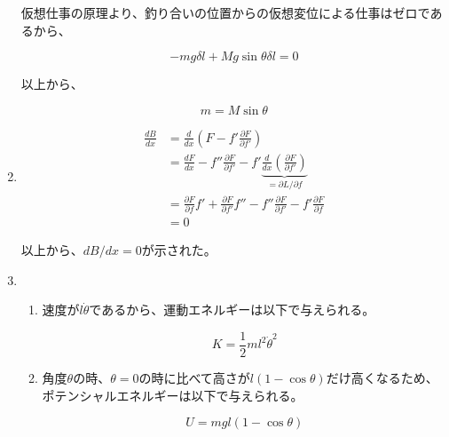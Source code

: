 \documentclass{jsarticle}
\begin{document}
\begin{enumerate}
        仮想仕事の原理より、釣り合いの位置からの仮想変位による仕事はゼロであるから、

        $$
          -mg \delta l + Mg \sin \theta \delta l = 0
        $$

        以上から、

        $$
          m = M\sin \theta
        $$
  \item
        $$
          \begin{aligned}
            \frac{dB}{dx} & = \frac{d}{dx} \left( F - f' \frac{\partial F}{\partial f'}\right)                  \\
                          & = \frac{dF}{dx} - f'' \frac{\partial F}{\partial f'}
            -  f' \underbrace{\frac{d}{dx}\left(\frac{\partial F}{\partial f'}\right)}_{=\partial L/\partial f} \\
                          & = \frac{\partial F}{\partial f}f' + \frac{\partial F}{\partial f'}f''
            - f'' \frac{\partial F}{\partial f'} - f' \frac{\partial F}{\partial f}                             \\
                          & = 0
          \end{aligned}
        $$

        以上から、$dB/dx = 0$が示された。
  \item
        \begin{enumerate}
          \item 速度が$l\dot{\theta}$であるから、運動エネルギーは以下で与えられる。

                $$
                  K= \frac{1}{2}m l^2 \dot{\theta}^2
                $$
          \item 角度$\theta$の時、$\theta=0$の時に比べて高さが$l(1-\cos\theta)$だけ高くなるため、ポテンシャルエネルギーは以下で与えられる。

                $$
                  U = mgl (1- \cos \theta)
                $$


\end{enumerate}
\end{enumerate}
\end{document}
